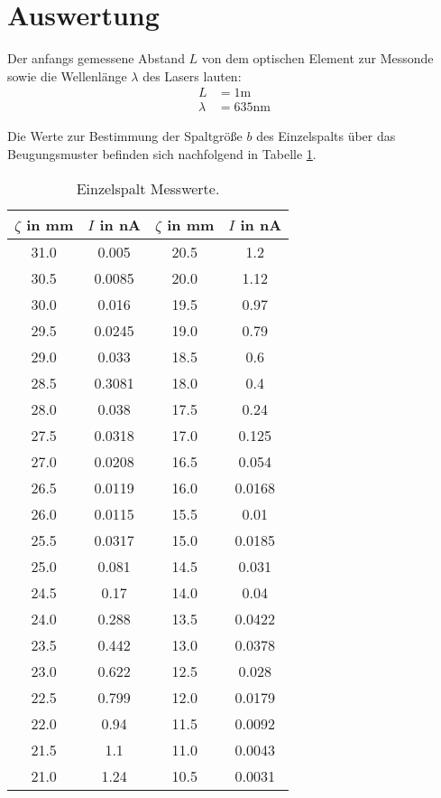 \section{Auswertung}
\label{sec:Auswertung}

Der anfangs gemessene Abstand $L$ von dem optischen Element zur Messonde sowie die Wellenlänge $\lambda$ des Lasers lauten:
\begin{align*}
  L &= 1 \text{m} \\
  \lambda &= 635 \text{nm}
\end{align*}

Die Werte zur Bestimmung der Spaltgröße $b$ des Einzelspalts über das Beugungsmuster befinden sich nachfolgend in Tabelle \ref{tab:einzel}.

\begin{table}
  \centering
  \caption{Einzelspalt Messwerte.}
  \label{tab:einzel}
\begin{tabular}{c c | c c}
  \toprule
  $\zeta$ in mm & $I$ in nA & $\zeta$ in mm & $I$ in nA \\
  \midrule
  31.0  &  0.005  &  20.5  &  1.2 \\
  30.5  &  0.0085  &  20.0  &  1.12 \\
  30.0  &  0.016  &  19.5  &  0.97 \\
  29.5  &  0.0245  &  19.0  &  0.79 \\
  29.0  &  0.033  &  18.5  &  0.6 \\
  28.5  &  0.3081  &  18.0  &  0.4 \\
  28.0  &  0.038  &  17.5  &  0.24 \\
  27.5  &  0.0318  &  17.0  &  0.125 \\
  27.0  &  0.0208  &  16.5  &  0.054 \\
  26.5  &  0.0119  &  16.0  &  0.0168 \\
  26.0  &  0.0115  &  15.5  &  0.01 \\
  25.5  &  0.0317  &  15.0  &  0.0185 \\
  25.0  &  0.081  &  14.5  &  0.031 \\
  24.5  &  0.17  &  14.0  &  0.04 \\
  24.0  &  0.288  &  13.5  &  0.0422 \\
  23.5  &  0.442  &  13.0  &  0.0378 \\
  23.0  &  0.622  &  12.5  &  0.028 \\
  22.5  &  0.799  &  12.0  &  0.0179 \\
  22.0  &  0.94  &  11.5  &  0.0092 \\
  21.5  &  1.1  &  11.0  &  0.0043 \\
  21.0  &  1.24  &  10.5  &  0.0031 \\
  \bottomrule
\end{tabular}
\end{table}
\FloatBarrier

